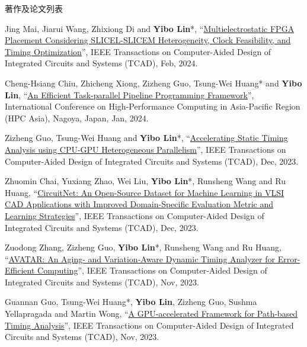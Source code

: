\begin{rSection}{著作及论文列表}
\begin{description}[font=\normalfont, rightmargin=2em]
{}
            

\item[{[J135]}]{
        Jing Mai, Jiarui Wang, Zhixiong Di and \textbf{Yibo Lin}*, 
    ``\href{https://doi.org/10.1109/TCAD.2023.3313101}{Multielectrostatic FPGA Placement Considering SLICEL-SLICEM Heterogeneity, Clock Feasibility, and Timing Optimization}'', 
    IEEE Transactions on Computer-Aided Design of Integrated Circuits and Systems (TCAD), Feb, 2024.
    
}
            

\item[{[C134]}]{
        Cheng-Hsiang Chiu, Zhicheng Xiong, Zizheng Guo, Tsung-Wei Huang* and \textbf{Yibo Lin}, 
    ``\href{https://doi.org/10.1145/3635035.3635037}{An Efficient Task-parallel Pipeline Programming Framework}'', 
    International Conference on High-Performance Computing in Asia-Pacific Region (HPC Asia), Nagoya, Japan, Jan, 2024.
    
}
            

\item[{[J133]}]{
        Zizheng Guo, Tsung-Wei Huang and \textbf{Yibo Lin}*, 
    ``\href{https://doi.org/10.1109/TCAD.2023.3286261}{Accelerating Static Timing Analysis using CPU-GPU Heterogeneous Parallelism}'', 
    IEEE Transactions on Computer-Aided Design of Integrated Circuits and Systems (TCAD), Dec, 2023.
    
}
            

\item[{[J132]}]{
        Zhuomin Chai, Yuxiang Zhao, Wei Liu, \textbf{Yibo Lin}*, Runsheng Wang and Ru Huang, 
    ``\href{https://doi.org/10.1109/TCAD.2023.3287970}{CircuitNet: An Open-Source Dataset for Machine Learning in VLSI CAD Applications with Improved Domain-Specific Evaluation Metric and Learning Strategies}'', 
    IEEE Transactions on Computer-Aided Design of Integrated Circuits and Systems (TCAD), Dec, 2023.
    
}
            

\item[{[J131]}]{
        Zuodong Zhang, Zizheng Guo, \textbf{Yibo Lin}*, Runsheng Wang and Ru Huang, 
    ``\href{https://doi.org/10.1109/TCAD.2023.3255167}{AVATAR: An Aging- and Variation-Aware Dynamic Timing Analyzer for Error-Efficient Computing}'', 
    IEEE Transactions on Computer-Aided Design of Integrated Circuits and Systems (TCAD), Nov, 2023.
    
}
            

\item[{[J130]}]{
        Guannan Guo, Tsung-Wei Huang*, \textbf{Yibo Lin}, Zizheng Guo, Sushma Yellapragada and Martin Wong, 
    ``\href{https://doi.org/10.1109/TCAD.2023.3272274}{A GPU-accelerated Framework for Path-based Timing Analysis}'', 
    IEEE Transactions on Computer-Aided Design of Integrated Circuits and Systems (TCAD), Nov, 2023.
    
}
\end{description}
\end{rSection}

